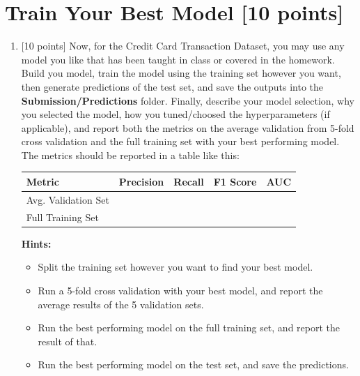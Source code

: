 \documentclass[letterpaper]{article}
\begin{document}
\section{Train Your Best Model [10 points]}

\begin{enumerate}
\item {[10 points]} 
Now, for the Credit Card Transaction Dataset, you may use any model you like that has been taught in class or covered in the homework. Build you model, train the model using the training set however you want, then generate predictions of the test set, and save the outputs into the \textbf{Submission/Predictions} folder. Finally, describe your model selection, why you selected the model, how you tuned/choosed the hyperparameters (if applicable), and report both the metrics on the average validation from 5-fold cross validation and the full training set with your best performing model. The metrics should be reported in a table like this:\\
\begin{table}[h!]
\center
\begin{tabular}{|l|c|c|c|c|}\hline
Metric              & Precision & Recall & F1 Score & AUC \\\hline
Avg. Validation Set &           &        &          &     \\\hline
Full Training Set   &           &        &          &     \\\hline
\end{tabular}
\end{table}

\textbf{Hints:}
\begin{itemize}
    \item Split the training set however you want to find your best model.
    \item Run a 5-fold cross validation with your best model, and report the average results of the 5 validation sets.
    \item Run the best performing model on the full training set, and report the result of that.
    \item Run the best performing model on the test set, and save the predictions.
\end{itemize}


\end{enumerate}
\end{document}
